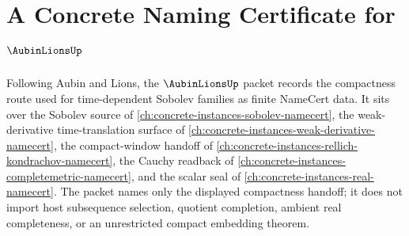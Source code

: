 \chapter{A Concrete Naming Certificate for $\AubinLionsUp$}
\label{ch:concrete-instances-aubin-lions-namecert}

Following Aubin and Lions, the $\AubinLionsUp$ packet records the compactness route used for time-dependent Sobolev families as finite NameCert data. It sits over the Sobolev source of \autoref{ch:concrete-instances-sobolev-namecert}, the weak-derivative time-translation surface of \autoref{ch:concrete-instances-weak-derivative-namecert}, the compact-window handoff of \autoref{ch:concrete-instances-rellich-kondrachov-namecert}, the Cauchy readback of \autoref{ch:concrete-instances-completemetric-namecert}, and the scalar seal of \autoref{ch:concrete-instances-real-namecert}. The packet names only the displayed compactness handoff; it does not import host subsequence selection, quotient completion, ambient real completeness, or an unrestricted compact embedding theorem.

